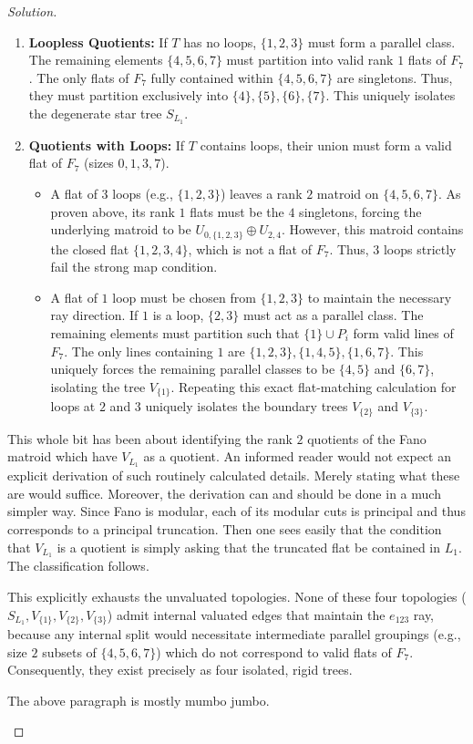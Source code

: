 \documentclass[12pt]{article}
\newcommand{\review}[1]{\begin{reviewbox}#1\end{reviewbox}}
\begin{document}
\begin{proof}[Solution]
\begin{enumerate}
    \item \textbf{Loopless Quotients:} If $T$ has no loops, $\{1,2,3\}$ must form a parallel class. The remaining elements $\{4,5,6,7\}$ must partition into valid rank $1$ flats of $F_7$. The only flats of $F_7$ fully contained within $\{4,5,6,7\}$ are singletons. Thus, they must partition exclusively into $\{4\}, \{5\}, \{6\}, \{7\}$. This uniquely isolates the degenerate star tree $S_{L_1}$.
    \item \textbf{Quotients with Loops:} If $T$ contains loops, their union must form a valid flat of $F_7$ (sizes $0, 1, 3, 7$). 
    \begin{itemize}
        \item A flat of $3$ loops (e.g., $\{1,2,3\}$) leaves a rank $2$ matroid on $\{4,5,6,7\}$. As proven above, its rank $1$ flats must be the $4$ singletons, forcing the underlying matroid to be $U_{0,\{1,2,3\}} \oplus U_{2,4}$. However, this matroid contains the closed flat $\{1,2,3,4\}$, which is not a flat of $F_7$. Thus, $3$ loops strictly fail the strong map condition.
        \item A flat of $1$ loop must be chosen from $\{1,2,3\}$ to maintain the necessary ray direction. If $1$ is a loop, $\{2,3\}$ must act as a parallel class. The remaining elements must partition such that $\{1\} \cup P_i$ form valid lines of $F_7$. The only lines containing $1$ are $\{1,2,3\}, \{1,4,5\}, \{1,6,7\}$. This uniquely forces the remaining parallel classes to be $\{4,5\}$ and $\{6,7\}$, isolating the tree $V_{\{1\}}$. Repeating this exact flat-matching calculation for loops at $2$ and $3$ uniquely isolates the boundary trees $V_{\{2\}}$ and $V_{\{3\}}$.
    \end{itemize}
\end{enumerate}

\review{
This whole bit has been about identifying the rank $2$ quotients of the Fano matroid which have $V_{L_1}$ as a quotient. An informed reader would not expect an explicit derivation of such routinely calculated details. Merely stating what these are would suffice. Moreover, the derivation can and should be done in a much simpler way. Since Fano is modular, each of its modular cuts is principal and thus corresponds to a principal truncation. Then one sees easily that the condition that $V_{L_1}$ is a quotient is simply asking that the truncated flat be contained in $L_1$. The classification follows.
}

This explicitly exhausts the unvaluated topologies. None of these four topologies ($S_{L_1}, V_{\{1\}}, V_{\{2\}}, V_{\{3\}}$) admit internal valuated edges that maintain the $e_{123}$ ray, because any internal split would necessitate intermediate parallel groupings (e.g., size $2$ subsets of $\{4,5,6,7\}$) which do not correspond to valid flats of $F_7$. Consequently, they exist precisely as four isolated, rigid trees.
\review{The above paragraph is mostly mumbo jumbo.}


\end{proof}
\end{document}
